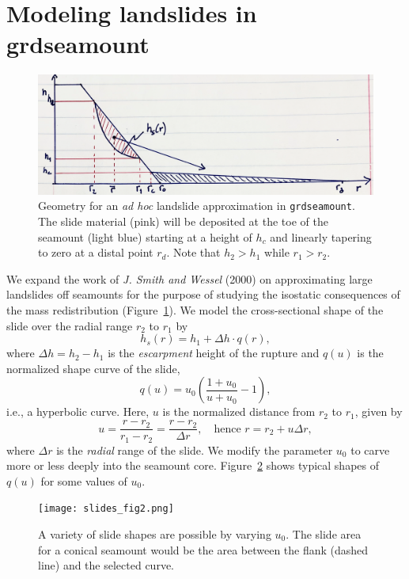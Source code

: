\documentclass[12pt,letterpaper,margin=0.5in]{report}
\begin{document}
\section{Modeling landslides in grdseamount}

\begin{figure}[h!]
  \centering
  \includegraphics[width=5in]{slides_fig1.png}
  \caption{Geometry for an \emph{ad hoc} landslide approximation in \texttt{grdseamount}.  The slide material (pink)
  will be deposited at the toe of the seamount (light blue) starting at a height of $h_c$ and linearly
  tapering to zero at a distal point $r_d$. Note that $h_2 > h_1$ while $r_1 > r_2$.}
  \label{slides_fig1}
\end{figure}

We expand the work of {\it J. Smith and Wessel} (2000) on approximating large landslides off seamounts
for the purpose of studying the isostatic consequences of the mass redistribution (Figure~\ref{slides_fig1}).  We model the
cross-sectional shape of the slide over the radial range $r_2$ to $r_1$ by
\begin{equation}
h_s(r) = h_1 + \Delta h \cdot q(r),
\end{equation}
where $\Delta h = h_2 - h_1$ is the \emph{escarpment} height of the rupture and $q(u)$ is the normalized shape curve of the slide,
\begin{equation}
q(u) = u_0 \left (\frac{1 + u_0}{u + u_0} - 1 \right ),
\end{equation}
i.e., a hyperbolic curve.  Here, $u$ is the normalized distance from $r_2$ to $r_1$, given by
\begin{equation}
u = \frac{r-r_2}{r_1 - r_2} = \frac{r-r_2}{\Delta r}, \quad \mbox{hence } r = r_2 + u \Delta r,
\end{equation}
where $\Delta r$ is the \emph{radial} range of the slide. We modify the parameter $u_0$ to carve more or less deeply into the seamount core.
Figure~\ref{slides_fig2} shows typical shapes of $q(u)$ for some values of $u_0$.
\begin{figure}[h!]
  \centering
  \texttt{[image: slides\_fig2.png]}
  \caption{A variety of slide shapes are possible by varying $u_0$.  The slide area for a conical seamount would be the area
  between the flank (dashed line) and the selected curve.}
  \label{slides_fig2}
\end{figure}
\end{document}
